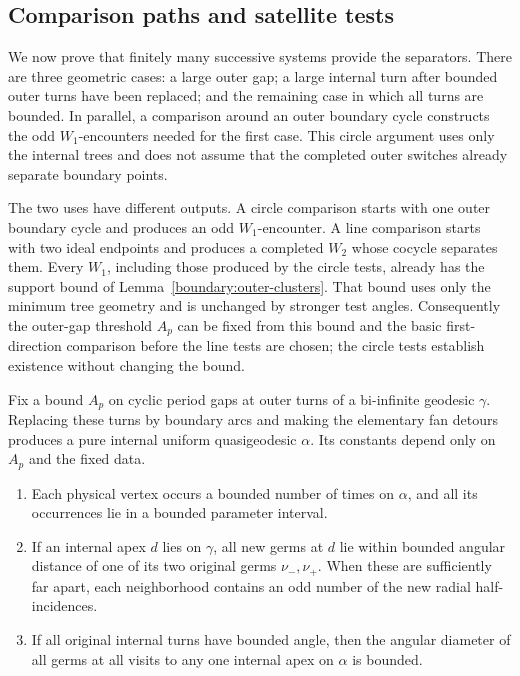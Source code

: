 \subsection{Comparison paths and satellite tests}

We now prove that finitely many successive systems provide the separators.
There are three geometric cases: a large outer gap; a large internal
turn after bounded outer turns have been replaced; and the remaining
case in which all turns are bounded. In parallel, a comparison around
an outer boundary cycle constructs the odd $W_1$-encounters needed for
the first case. This circle argument uses only the internal trees and
does not assume that the completed outer switches already separate
boundary points.

The two uses have different outputs. A circle comparison starts with one
outer boundary cycle and produces an odd $W_1$-encounter. A line comparison
starts with two ideal endpoints and produces a completed $W_2$ whose
cocycle separates them. Every $W_1$, including those produced by the
circle tests, already has the support bound of
Lemma~\ref{boundary:outer-clusters}. That bound uses only the minimum tree
geometry and is unchanged by stronger test angles. Consequently the
outer-gap threshold $A_p$ can be fixed from this bound and the basic
first-direction comparison before the line tests are chosen; the circle
tests establish existence without changing the bound.

\begin{lemma}\label{boundary:normalization}
Fix a bound $A_p$ on cyclic period gaps at outer turns of a bi-infinite
geodesic $\gamma$. Replacing these turns by boundary arcs and making the
elementary fan detours produces a pure internal uniform quasigeodesic
$\alpha$. Its constants depend only on $A_p$ and the fixed data.
\begin{enumerate}[label=\textup{(\roman*)}]
\item Each physical vertex occurs a bounded number of times on $\alpha$,
and all its occurrences lie in a bounded parameter interval.
\item If an internal apex $d$ lies on $\gamma$, all new germs at $d$ lie
within bounded angular distance of one of its two original germs
$\nu_-,\nu_+$. When these are sufficiently far apart, each neighborhood
contains an odd number of the new radial half-incidences.
\item If all original internal turns have bounded angle, then the angular
diameter of all germs at all visits to any one internal apex on $\alpha$
is bounded.
\end{enumerate}
\end{lemma}

